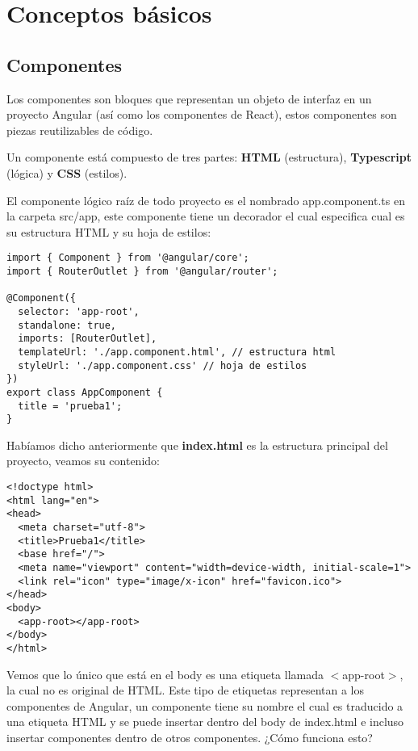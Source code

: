 \section{Conceptos básicos}


\subsection{Componentes}

Los componentes son bloques que representan un objeto de interfaz en un proyecto Angular (así como los componentes de React), estos componentes son piezas reutilizables de código.

Un componente está compuesto de tres partes: \textbf{HTML} (estructura), \textbf{Typescript} (lógica) y \textbf{CSS} (estilos).

El componente lógico raíz de todo proyecto es el nombrado app.component.ts en la carpeta src/app, este componente tiene un decorador el cual especifica cual es su estructura HTML y su hoja de estilos:
\begin{lstlisting}[style=htmlcssjs]
import { Component } from '@angular/core';
import { RouterOutlet } from '@angular/router';

@Component({
  selector: 'app-root',
  standalone: true,
  imports: [RouterOutlet],
  templateUrl: './app.component.html', // estructura html
  styleUrl: './app.component.css' // hoja de estilos
})
export class AppComponent {
  title = 'prueba1';
}
\end{lstlisting}

Habíamos dicho anteriormente que \textbf{index.html} es la estructura principal del proyecto, veamos su contenido:
\begin{lstlisting}[style=htmlcssjs]
<!doctype html>
<html lang="en">
<head>
  <meta charset="utf-8">
  <title>Prueba1</title>
  <base href="/">
  <meta name="viewport" content="width=device-width, initial-scale=1">
  <link rel="icon" type="image/x-icon" href="favicon.ico">
</head>
<body>
  <app-root></app-root>
</body>
</html>
\end{lstlisting}

Vemos que lo único que está en el body es una etiqueta llamada $<$app-root$>$, la cual no es original de HTML. Este tipo de etiquetas representan a los componentes de Angular, un componente tiene su nombre el cual es traducido a una etiqueta HTML y se puede insertar dentro del body de index.html e incluso insertar componentes dentro de otros componentes. ¿Cómo funciona esto?

